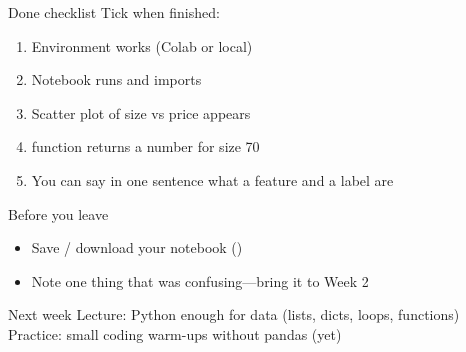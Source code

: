 \documentclass[aspectratio=169,11pt]{beamer}
\begin{document}
    \begin{frame}{Done checklist}
        Tick when finished:
        \begin{enumerate}
            \item Environment works (Colab or local)
            \item Notebook runs  and imports 
            \item Scatter plot of size vs price appears
            \item {} function returns a number for size 70
            \item You can say in one sentence what a feature and a label are
        \end{enumerate}
    \end{frame}

    \begin{frame}{Before you leave}
        \begin{itemize}
            \item Save / download your notebook ()
            \item Note one thing that was confusing---bring it to Week 2
        \end{itemize}
        \vspace{0.6em}
        \begin{block}{Next week}
            Lecture: Python enough for data (lists, dicts, loops, functions)\\
            Practice: small coding warm-ups without pandas (yet)
        \end{block}
    \end{frame}
\end{document}
